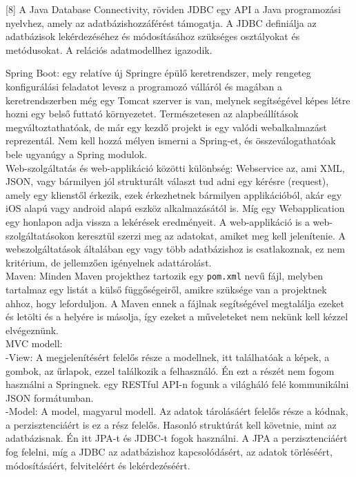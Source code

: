\documentclass[11pt]{article}
\begin{document}
[8] A Java Database Connectivity, röviden JDBC egy API a Java programozási nyelvhez, amely az adatbázishozzáférést támogatja. A JDBC definiálja az adatbázisok lekérdezéséhez és módosításához szükséges osztályokat és metódusokat. A relációs adatmodellhez igazodik.

Spring Boot: egy relatíve új Springre épülő keretrendszer, mely rengeteg konfigurálási feladatot levesz a programozó válláról és magában a keretrendszerben még egy Tomcat szerver is van, melynek segítségével képes létre hozni egy belső futtató környezetet. Természetesen az alapbeállítások megváltoztathatóak, de már egy kezdő projekt is egy valódi webalkalmazást reprezentál. Nem kell hozzá mélyen ismerni a Spring-et, és összeválogathatóak bele ugyanúgy a Spring modulok. \\

Web-szolgáltatás és web-applikáció közötti különbség: Webservice az, ami XML, JSON, vagy bármilyen jól strukturált választ tud adni egy kérésre (request), amely egy klienstől érkezik, ezek érkezhetnek bármilyen applikációból, akár egy iOS alapú vagy android alapú eszköz alkalmazásától is. Míg egy Webapplication egy honlapon adja vissza a lekérések eredményeit. A web-applikáció is a web-szolgáltatásokon keresztül szerzi meg az adatokat, amiket meg kell jelenítenie. A webszolgáltatások általában egy vagy több adatbázishoz is csatlakoznak, ez nem kritérium, de jellemzően igényelnek adattárolást.\\

Maven: Minden Maven projekthez tartozik egy \texttt{pom.xml} nevű fájl, melyben tartalmaz egy listát a külső függőségeiről, amikre szüksége van a projektnek ahhoz, hogy leforduljon. A Maven ennek a fájlnak segítségével megtalálja ezeket és letölti és a helyére is másolja, így ezeket a műveleteket nem nekünk kell kézzel elvégeznünk.\\

MVC modell:\\

-View: A megjelenítésért felelős része a modellnek, itt találhatóak a képek, a gombok, az űrlapok, ezzel találkozik a felhasználó. Én ezt a részét nem fogom használni a Springnek. egy RESTful API-n fogunk a világháló felé kommunikálni JSON formátumban.\\

-Model: A model, magyarul modell. Az adatok tárolásáért felelős része a kódnak, a perzisztenciáért is ez a rész felelős. Hasonló struktúrát kell követnie, mint az adatbázisnak. Én itt JPA-t és JDBC-t fogok használni. A JPA a perzisztenciáért fog felelni, míg a JDBC az adatbázishoz kapcsolódásért, az adatok törléséért, módosításáért, felviteléért és lekérdezéséért.\\
\end{document}
